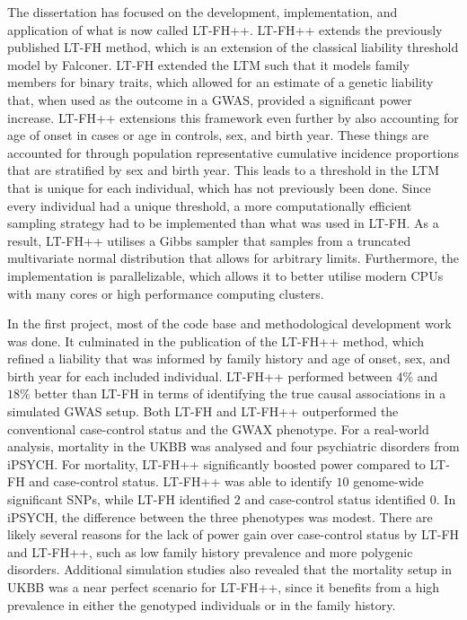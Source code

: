 The dissertation has focused on the development, implementation, and application of what is now called LT-FH++. LT-FH++ extends the previously published LT-FH method, which is an extension of the classical liability threshold model by Falconer. LT-FH extended the LTM such that it models family members for binary traits, which allowed for an estimate of a genetic liability that, when used as the outcome in a GWAS, provided a significant power increase. LT-FH++ extensions this framework even further by also accounting for age of onset in cases or age in controls, sex, and birth year. These things are accounted for through population representative cumulative incidence proportions that are stratified by sex and birth year. This leads to a threshold in the LTM that is unique for each individual, which has not previously been done. Since every individual had a unique threshold, a more computationally efficient sampling strategy had to be implemented than what was used in LT-FH. As a result, LT-FH++ utilises a Gibbs sampler that samples from a truncated multivariate normal distribution that allows for arbitrary limits. Furthermore, the implementation is parallelizable, which allows it to better utilise modern CPUs with many cores or high performance computing clusters.

In the first project, most of the code base and methodological development work was done. It culminated in the publication of the LT-FH++ method, which refined a liability that was informed by family history and age of onset, sex, and birth year for each included individual. LT-FH++ performed between $ 4\% $ and $ 18\% $ better than LT-FH in terms of identifying the true causal associations in a simulated GWAS setup. Both LT-FH and LT-FH++ outperformed the conventional case-control status and the GWAX phenotype. For a real-world analysis, mortality in the UKBB was analysed and four psychiatric disorders from iPSYCH. For mortality, LT-FH++ significantly boosted power compared to LT-FH and case-control status. LT-FH++ was able to identify $ 10 $ genome-wide significant SNPs, while LT-FH identified $ 2 $ and case-control status identified $ 0 $. In iPSYCH, the difference between the three phenotypes was modest. There are likely several reasons for the lack of power gain over case-control status by LT-FH and LT-FH++, such as low family history prevalence and more polygenic disorders. Additional simulation studies also revealed that the mortality setup in UKBB was a near perfect scenario for LT-FH++, since it benefits from a high prevalence in either the genotyped individuals or in the family history.

